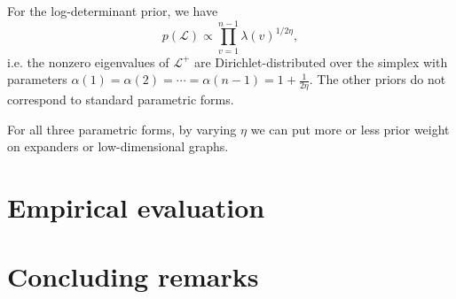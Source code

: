 \documentclass[12pt]{article}
\theoremstyle{plain}
\begin{document}
For the log-determinant prior, we have
\[
  p(\mathcal{L})
    \propto \prod_{v=1}^{n-1} \lambda(v)^{1/2 \eta},
\]
i.e. the nonzero eigenvalues of $\mathcal{L}^{+}$ are
Dirichlet-distributed over the simplex with parameters $\alpha(1) =
\alpha(2) = \dotsb = \alpha(n-1) = 1 + \tfrac{1}{2\eta}$.  The other
priors do not correspond to standard parametric forms.

For all three parametric forms, by varying $\eta$ we can put more or
less prior weight on expanders or low-dimensional graphs.



\section{Empirical evaluation}

\section{Concluding remarks}



\end{document}
